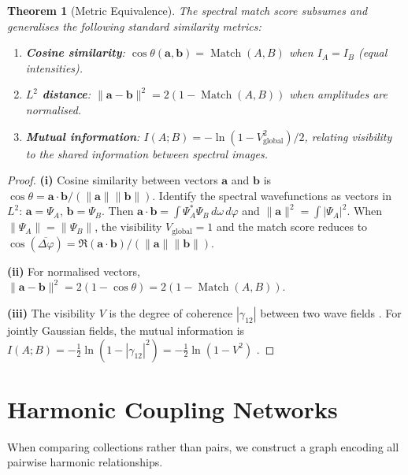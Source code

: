 \documentclass[11pt,twocolumn,a4paper]{article}
\newtheorem{theorem}{Theorem}[section]
\DeclareMathOperator{\Match}{Match}
\begin{document}
\begin{theorem}[Metric Equivalence]
\label{thm:metric_equivalence}
The spectral match score subsumes and generalises the following standard
similarity metrics:
\begin{enumerate}[label=(\roman*),nosep]
  \item \textbf{Cosine similarity}: $\cos\theta(\mathbf{a}, \mathbf{b})
    = \Match(A, B)$ when $I_A = I_B$ (equal intensities).
  \item \textbf{$L^2$ distance}: $\|\mathbf{a} - \mathbf{b}\|^2 =
    2(1 - \Match(A, B))$ when amplitudes are normalised.
  \item \textbf{Mutual information}:
    $I(A; B) = -\ln(1 - V_{\text{global}}^2)/2$, relating visibility
    to the shared information between spectral images.
\end{enumerate}
\end{theorem}

\begin{proof}
\textbf{(i)} Cosine similarity between vectors $\mathbf{a}$ and
$\mathbf{b}$ is $\cos\theta = \mathbf{a} \cdot \mathbf{b} /
(\|\mathbf{a}\| \|\mathbf{b}\|)$. Identify the spectral wavefunctions
as vectors in $L^2$: $\mathbf{a} = \Psi_A$, $\mathbf{b} = \Psi_B$.
Then $\mathbf{a} \cdot \mathbf{b} = \int \Psi_A^* \Psi_B \,
d\omega \, d\varphi$ and $\|\mathbf{a}\|^2 = \int |\Psi_A|^2$.
When $\|\Psi_A\| = \|\Psi_B\|$, the visibility $V_{\text{global}} = 1$
and the match score reduces to $\cos(\overline{\Delta\varphi}) =
\Re(\mathbf{a} \cdot \mathbf{b})/(\|\mathbf{a}\|\|\mathbf{b}\|)$.

\textbf{(ii)} For normalised vectors, $\|\mathbf{a} - \mathbf{b}\|^2 =
2(1 - \cos\theta) = 2(1 - \Match(A, B))$.

\textbf{(iii)} The visibility $V$ is the degree of coherence
$|\gamma_{12}|$ between two wave fields \citep{born1999, vanzernike1938,
glauber1963}. For jointly Gaussian fields, the mutual information is
$I(A; B) = -\frac{1}{2}\ln(1 - |\gamma_{12}|^2) =
-\frac{1}{2}\ln(1 - V^2)$ \citep{cover2006}.
\end{proof}


\section{Harmonic Coupling Networks}
\label{sec:harmonic_coupling}

When comparing collections rather than pairs, we construct a graph
encoding all pairwise harmonic relationships.
\end{document}
